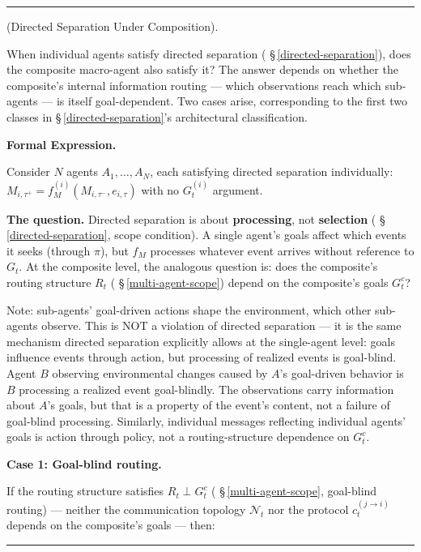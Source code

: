 \documentclass[11pt,oneside]{article}
\newcounter{claim}[section]
\renewcommand{\theclaim}{\thesection.\arabic{claim}}
\newenvironment{segment}[2]{%
  \refstepcounter{claim}%
  \bigskip\noindent\hrule\smallskip
  \noindent{\bfseries #1~\theclaim}\enskip(#2).\par\smallskip
  \noindent\ignorespaces
}{%
  \par\smallskip\noindent\hrule\bigskip
}
\newenvironment{hypothesis}[1][]{\begin{segment}{Hypothesis}{#1}}{\end{segment}}
\begin{document}
\begin{hypothesis}[Directed Separation Under Composition]
\label{directed-separation-under-composition}
When individual agents satisfy directed separation ( \S\,\ref{directed-separation}), does the composite macro-agent also satisfy it? The answer depends on whether the composite's internal information routing — which observations reach which sub-agents — is itself goal-dependent. Two cases arise, corresponding to the first two classes in \S\,\ref{directed-separation}'s architectural classification.



\medskip\noindent\textbf{Formal Expression.}



Consider $N$ agents $A_1, \ldots, A_N$, each satisfying directed separation individually: $M_{i,\tau^+} = f_M^{(i)}(M_{i,\tau^-}, e_{i,\tau})$ with no $G_t^{(i)}$ argument.

\textbf{The question.} Directed separation is about \textbf{processing}, not \textbf{selection} ( \S\,\ref{directed-separation}, scope condition). A single agent's goals affect which events it seeks (through $\pi$), but $f_M$ processes whatever event arrives without reference to $G_t$. At the composite level, the analogous question is: does the composite's routing structure $R_t$ ( \S\,\ref{multi-agent-scope}) depend on the composite's goals $G_t^c$?

Note: sub-agents' goal-driven actions shape the environment, which other sub-agents observe. This is NOT a violation of directed separation — it is the same mechanism directed separation explicitly allows at the single-agent level: goals influence events through action, but processing of realized events is goal-blind. Agent $B$ observing environmental changes caused by $A$'s goal-driven behavior is $B$ processing a realized event goal-blindly. The observations carry information about $A$'s goals, but that is a property of the event's content, not a failure of goal-blind processing. Similarly, individual messages reflecting individual agents' goals is action through policy, not a routing-structure dependence on $G_t^c$.


\medskip\noindent\textbf{Case 1: Goal-blind routing.}



If the routing structure satisfies $R_t \perp G_t^c$ ( \S\,\ref{multi-agent-scope}, goal-blind routing) — neither the communication topology $\mathcal N_t$ nor the protocol $c_t^{(j \to i)}$ depends on the composite's goals — then:


\end{hypothesis}
\end{document}
